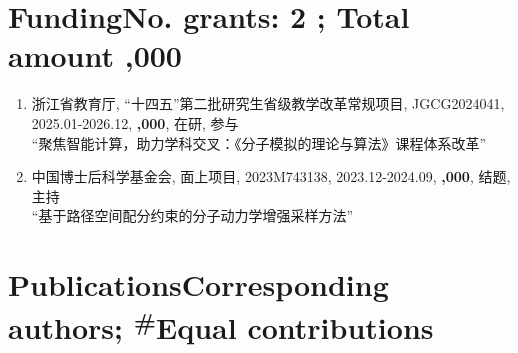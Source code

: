 \documentclass{article}
\newcommand*{\FundingProposals}[8]{#1, #2, #3, #4, \textbf{#5}, #6, #7\\``#8''}
\newcommand{\FirstAuthor}[1]{#1{\bf\textsuperscript{\#}}}
\newcommand{\CorrespondingAuthor}[1]{#1{\bf*}}
\begin{document}
\section*{Funding\hfill{\normalsize\normalfont No. grants: 2 ; Total amount ,000}}
\begin{enumerate}\justifying
  \item \FundingProposals{浙江省教育厅}{``十四五''第二批研究生省级教学改革常规项目}{JGCG2024041}{2025.01-2026.12}{\textyen 50,000}{在研}{参与}{聚焦智能计算，助力学科交叉：《分子模拟的理论与算法》课程体系改革}
  \item \FundingProposals{中国博士后科学基金会}{面上项目}{2023M743138}{2023.12-2024.09}{\textyen 80,000}{结题}{主持}{基于路径空间配分约束的分子动力学增强采样方法}
\end{enumerate}

\section*{Publications\hfill{\normalsize\normalfont \CorrespondingAuthor{}Corresponding authors; \FirstAuthor{}Equal contributions}}
\end{document}
